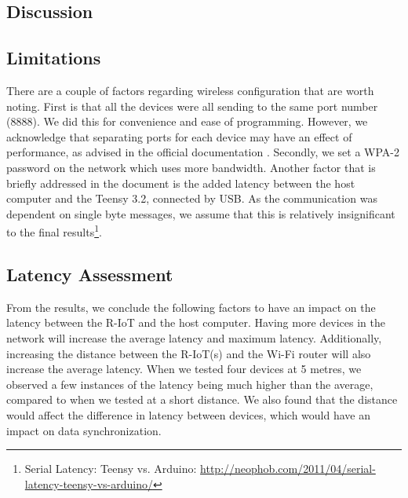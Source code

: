 \subsection{Discussion}

\subsection{Limitations}
There are a couple of factors regarding wireless configuration that are worth noting. First is that all the devices were all sending to the same port number (8888). We did this for convenience and ease of programming. However, we acknowledge that separating ports for each device may have an effect of performance, as advised in the official documentation \cite{BITalino R-IoT User Manual}. Secondly, we set a WPA-2 password on the network which uses more bandwidth. Another factor that is briefly addressed in the document is the added latency between the host computer and the Teensy 3.2, connected by USB. As the communication was dependent on single byte messages, we assume that this is relatively insignificant to the final results\footnote{Serial Latency: Teensy vs. Arduino: \url{http://neophob.com/2011/04/serial-latency-teensy-vs-arduino/}}.

\subsection{Latency Assessment}

From the results, we conclude the following factors to have an impact on the latency between the R-IoT and the host computer. Having more devices in the network will increase the average latency and maximum latency. Additionally, increasing the distance between the R-IoT(s) and the Wi-Fi router will also increase the average latency. When we tested four devices at 5 metres, we observed a few instances of the latency being much higher than the average, compared to when we tested at a short distance. We also found that the distance would affect the difference in latency between devices, which would have an impact on data synchronization.
